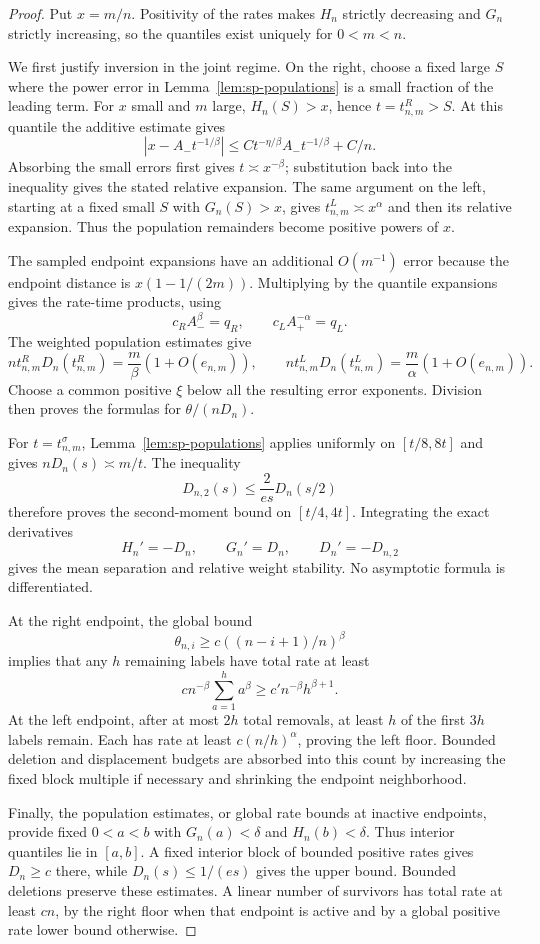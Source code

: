 \documentclass[11pt]{article}
\theoremstyle{remark}
\theoremstyle{plain}
\begin{document}
\begin{proof}
Put $x=m/n$.  Positivity of the rates makes $H_n$ strictly decreasing and
$G_n$ strictly increasing, so the quantiles exist uniquely for $0<m<n$.

We first justify inversion in the joint regime.  On the right, choose a
fixed large $S$ where the power error in Lemma~\ref{lem:sp-populations}
is a small fraction of the leading term.  For $x$ small and $m$ large,
$H_n(S)>x$, hence $t=t^R_{n,m}>S$.  At this quantile the additive
estimate gives
\[
 |x-A_-t^{-1/\beta}|
 \le Ct^{-\eta/\beta}A_-t^{-1/\beta}+C/n.
\]
Absorbing the small errors first gives $t\asymp x^{-\beta}$;
substitution back into the inequality gives the stated relative expansion.
The same argument on the left, starting at a fixed small $S$ with
$G_n(S)>x$, gives $t^L_{n,m}\asymp x^\alpha$ and then its relative
expansion.  Thus the population remainders become positive powers of $x$.

The sampled endpoint expansions have an additional $O(m^{-1})$ error
because the endpoint distance is $x(1-1/(2m))$.  Multiplying by the
quantile expansions gives the rate-time products, using
\[
 c_RA_-^\beta=q_R,\qquad c_LA_+^{-\alpha}=q_L.
\]
The weighted population estimates give
\[
 nt^R_{n,m}D_n(t^R_{n,m})=\frac m\beta(1+O(e_{n,m})),\qquad
 nt^L_{n,m}D_n(t^L_{n,m})=\frac m\alpha(1+O(e_{n,m})).
\]
Choose a common positive $\xi$ below all the resulting error exponents.
Division then proves the formulas for $\theta/(nD_n)$.

For $t=t^\sigma_{n,m}$, Lemma~\ref{lem:sp-populations} applies
uniformly on $[t/8,8t]$ and gives $nD_n(s)\asymp m/t$.  The inequality
\[
 D_{n,2}(s)\le\frac{2}{es}D_n(s/2)
\]
therefore proves the second-moment bound on $[t/4,4t]$.  Integrating
the exact derivatives
\[
 H_n'=-D_n,\qquad G_n'=D_n,\qquad D_n'=-D_{n,2}
\]
gives the mean separation and relative weight stability.  No asymptotic
formula is differentiated.

At the right endpoint, the global bound
\[
 \theta_{n,i}\ge c((n-i+1)/n)^\beta
\]
implies that any $h$ remaining labels have total rate at least
\[
 cn^{-\beta}\sum_{a=1}^h a^\beta\ge c'n^{-\beta}h^{\beta+1}.
\]
At the left endpoint, after at most $2h$ total removals, at least $h$
of the first $3h$ labels remain.  Each has rate at least $c(n/h)^\alpha$,
proving the left floor.  Bounded deletion and displacement budgets are
absorbed into this count by increasing the fixed block multiple if
necessary and shrinking the endpoint neighborhood.

Finally, the population estimates, or global rate bounds at inactive
endpoints, provide fixed $0<a<b$ with $G_n(a)<\delta$ and
$H_n(b)<\delta$.  Thus interior quantiles lie in $[a,b]$.  A fixed
interior block of bounded positive rates gives $D_n\ge c$ there, while
$D_n(s)\le1/(es)$ gives the upper bound.  Bounded deletions preserve
these estimates.  A linear number of survivors has total rate at least
$cn$, by the right floor when that endpoint is active and by a global
positive rate lower bound otherwise.
\end{proof}
\end{document}
